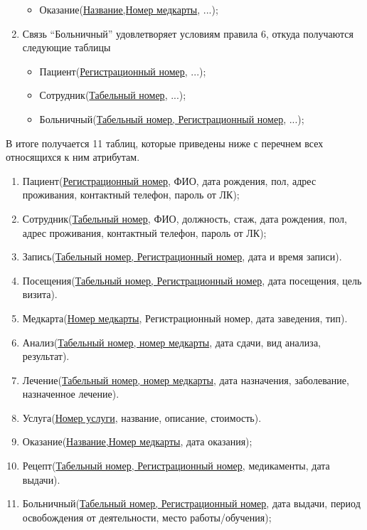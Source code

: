 \documentclass[14pt,a4paper,russian]{extreport}
\begin{document}
\begin{enumerate}
\begin{itemize}
            \item Оказание(\underline{Название,Номер медкарты}, ...);
        \end{itemize}
    \item Связь ``Больничный'' удовлетворяет условиям правила 6, откуда получаются следующие
        таблицы
        \begin{itemize}
            \item Пациент(\underline{Регистрационный номер}, ...);
            \item Сотрудник(\underline{Табельный номер}, ...);
            \item Больничный(\underline{Табельный номер, Регистрационный номер}, ...);
        \end{itemize}
\end{enumerate}
В итоге получается 11 таблиц, которые приведены ниже с перечнем всех относящихся к ним атрибутам.
\begin{enumerate}
            \item Пациент(\underline{Регистрационный номер}, ФИО, дата рождения, пол, адрес
                проживания, контактный телефон, пароль от ЛК);
            \item Сотрудник(\underline{Табельный номер}, ФИО, должность, стаж, дата рождения, пол, адрес
                проживания, контактный телефон, пароль от ЛК);
            \item Запись(\underline{Табельный номер, Регистрационный номер}, дата и время записи).
            \item Посещения(\underline{Табельный номер, Регистрационный номер}, дата посещения,
                цель визита).
            \item Медкарта(\underline{Номер медкарты}, Регистрационный номер, дата заведения, тип).
            \item Анализ(\underline{Табельный номер, номер медкарты}, дата сдачи, вид анализа,
                результат).
            \item Лечение(\underline{Табельный номер, номер медкарты}, дата назначения,
                заболевание, назначенное лечение).
            \item Услуга(\underline{Номер услуги}, название, описание, стоимость).
            \item Оказание(\underline{Название,Номер медкарты}, дата оказания);
            \item Рецепт(\underline{Табельный номер, Регистрационный номер}, медикаменты, дата
                выдачи).
            \item Больничный(\underline{Табельный номер, Регистрационный номер}, дата выдачи,
                период освобождения от деятельности, место работы/обучения);
\end{enumerate}
\end{document}

